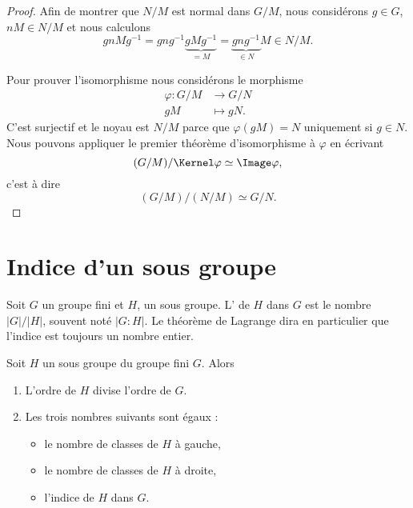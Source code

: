 \begin{proof}
    Afin de montrer que \( N/M\) est normal dans \( G/M\), nous considérons \( g\in G\), \( nM\in N/M\) et nous calculons
    \begin{equation}
        gnMg^{-1}=gng^{-1}\underbrace{gMg^{-1}}_{=M}=\underbrace{gng^{-1}}_{\in N}M\in N/M.
    \end{equation}

    Pour prouver l'isomorphisme nous considérons le morphisme
    \begin{equation}
        \begin{aligned}
            \varphi\colon G/M&\to G/N \\
            gM&\mapsto gN. 
        \end{aligned}
    \end{equation}
    C'est surjectif et le noyau est \( N/M\) parce que \( \varphi(gM)=N\) uniquement si \( g\in N\). Nous pouvons appliquer le premier théorème d'isomorphisme à \( \varphi\) en écrivant
    \begin{equation}
        (G/M)/\Kernel \varphi\simeq\Image \varphi,
    \end{equation}
    c'est à dire
    \begin{equation}
        (G/M)/(N/M)\simeq G/N.
    \end{equation}
\end{proof}

\section{Indice d'un sous groupe}

Soit \( G\) un groupe fini et \( H\), un sous groupe. L' de \( H\) dans \( G\) est le nombre \( | G |/| H |\), souvent noté \( | G:H |\). Le théorème de Lagrange dira en particulier que l'indice est toujours un nombre entier.

\begin{theorem}      \label{ThoLagrange}
    Soit \( H\) un sous groupe du groupe fini \( G\).  Alors
    \begin{enumerate}
        \item
    L'ordre de \( H\) divise l'ordre de \( G\).
\item 
    Les trois nombres suivants sont égaux :
    \begin{itemize}
        \item
            le nombre de classes de \( H\) à gauche,
        \item
            le nombre de classes de \( H\) à droite,
        \item
            l'indice de \( H\) dans \( G\).
    \end{itemize}
    \end{enumerate}

\end{theorem}

